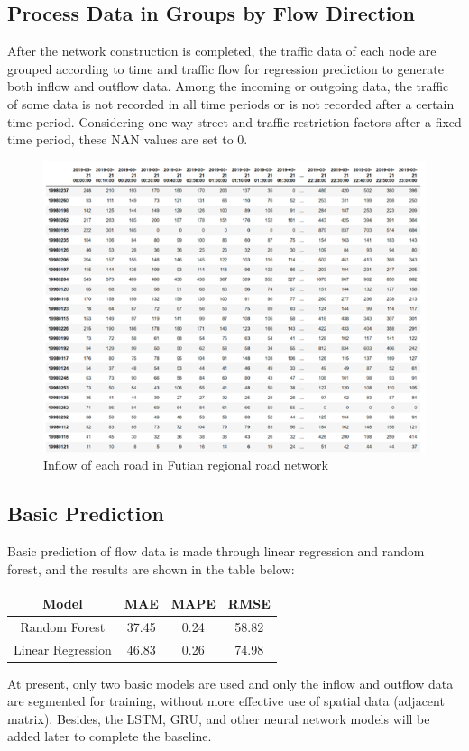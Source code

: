 \documentclass[fontset=none]{ctexart}
\theoremstyle{definition}
\theoremstyle{remark}
\begin{document}
\subsection{Process Data in Groups by Flow Direction}
After the network construction is completed, the traffic data of each node are grouped according to time and traffic flow for regression prediction to generate both inflow and outflow data. Among the incoming or outgoing data, the traffic of some data is not recorded in all time periods or is not recorded after a certain time period. Considering one-way street and traffic restriction factors after a fixed time period, these NAN values are set to 0.
\begin{figure}[htb]
  \centering
  \includegraphics[width=\textwidth]{images/9-3-4.png}
  \caption{Inflow of each road in Futian regional road network}
  \label{934}
\end{figure}

\clearpage
\subsection{Basic Prediction}
Basic prediction of flow data is made through linear regression and random forest, and the results are shown in the table below:
\begin{table}[htb]
  \centering
  \begin{tabular}{|c|c|c|c|}
  \hline
      Model & MAE & MAPE & RMSE\\ \hline
      Random Forest & 37.45 & 0.24 & 58.82\\
      Linear Regression & 46.83 & 0.26 & 74.98\\
  \hline
  \end{tabular}
\end{table}

At present, only two basic models are used and only the inflow and outflow data are segmented for training, without more effective use of spatial data (adjacent matrix). Besides, the LSTM, GRU, and other neural network models will be added later to complete the baseline.

\clearpage
{}
{}


\end{document}
